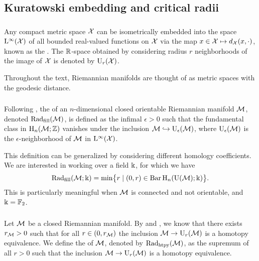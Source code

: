 
\subsection{Kuratowski embedding and critical radii}\label{sub:filling radii}

\subsubsection{}

Any compact metric space \(\cX\) can be isometrically embedded into the space \(\rL^\infty(\cX)\) of all bounded real-valued functions on \(\cX\) via the map \(x \in \cX \mapsto d_\cX(x,\cdot)\), known as the .
The \(\R\)-space obtained by considering radius \(r\) neighborhoods of the image of \(\cX\) is denoted by \(\rU_r(\cX)\).

Throughout the text, Riemannian manifolds are thought of as metric spaces with the geodesic distance.

\subsubsection{}

Following \cite{gromov1983filling}, the  of an \(n\)-dimensional closed orientable Riemannian manifold \(\cM\), denoted \(\fillrad(\cM)\), is defined as the infimal \(\epsilon > 0\) such that the fundamental class in \(\rH_n(\cM; \Z)\) vanishes under the inclusion \(\cM \hookrightarrow \rU_\epsilon(\cM)\), where \(\rU_\epsilon(\cM)\) is the \(\epsilon\)-neighborhood of \(\cM\) in \(\rL^\infty(\cX)\).

This definition can be generalized by considering different homology coefficients.
We are interested in working over a field \(\k\), for which we have
\[
\fillrad(\cM; \field) = \min\set[\big]{r \mid (0, r) \in \barc \rH_n(\rU(\cM); \field)}.
\]
This is particularly meaningful when \(\cM\) is connected and not orientable, and \(\k = \Ftwo\).

\subsubsection{}\label{ss:first_critical_value}

Let \(\cM\) be a closed Riemannian manifold.
By \cite[Thm.~3.5]{hausmann1995vietoris} and \cite[Thm.~4.1]{lim2024vietoris}, we know that there exists \(r_\cM > 0\) such that for all \(r \in (0, r_\cM)\) the inclusion \(\cM \to \rU_{r}(\cM)\) is a homotopy equivalence.
We define the  of \(\cM\), denoted by \(\crit(\cM)\), as the supremum of all \(r > 0\) such that the inclusion \(\cM \to \rU_r(\cM)\) is a homotopy equivalence.


